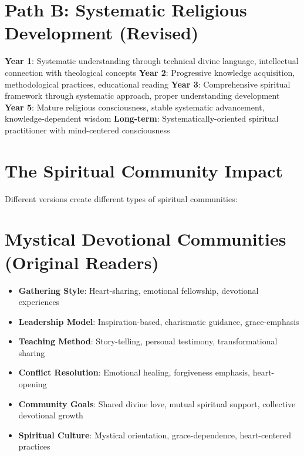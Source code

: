 \documentclass[11pt,twoside]{book}
\begin{document}
\section*{Path B: Systematic Religious Development (Revised)}
\label{sec:orge49aad5}
\textbf{\textbf{Year 1}}: Systematic understanding through technical divine language, intellectual connection with theological concepts
\textbf{\textbf{Year 2}}: Progressive knowledge acquisition, methodological practices, educational reading
\textbf{\textbf{Year 3}}: Comprehensive spiritual framework through systematic approach, proper understanding development
\textbf{\textbf{Year 5}}: Mature religious consciousness, stable systematic advancement, knowledge-dependent wisdom
\textbf{\textbf{Long-term}}: Systematically-oriented spiritual practitioner with mind-centered consciousness
\section*{The Spiritual Community Impact}
\label{sec:orgedfee08}

Different versions create different types of spiritual communities:
\section*{Mystical Devotional Communities (Original Readers)}
\label{sec:orgacde48b}
\begin{itemize}
\item \textbf{\textbf{Gathering Style}}: Heart-sharing, emotional fellowship, devotional experiences
\item \textbf{\textbf{Leadership Model}}: Inspiration-based, charismatic guidance, grace-emphasis
\item \textbf{\textbf{Teaching Method}}: Story-telling, personal testimony, transformational sharing
\item \textbf{\textbf{Conflict Resolution}}: Emotional healing, forgiveness emphasis, heart-opening
\item \textbf{\textbf{Community Goals}}: Shared divine love, mutual spiritual support, collective devotional growth
\item \textbf{\textbf{Spiritual Culture}}: Mystical orientation, grace-dependence, heart-centered practices
\end{itemize}
\end{document}

